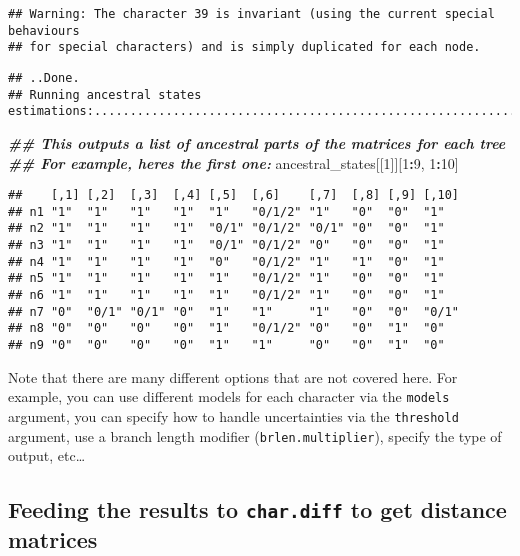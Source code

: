\documentclass[
]{book}
\newenvironment{Shaded}{\begin{snugshade}}{\end{snugshade}}
\newcommand{\DecValTok}[1]{\textcolor[rgb]{0.00,0.00,0.81}{#1}}
\newcommand{\DocumentationTok}[1]{\textcolor[rgb]{0.56,0.35,0.01}{\textbf{\textit{#1}}}}
\newcommand{\NormalTok}[1]{#1}
\newcommand{\SpecialCharTok}[1]{\textcolor[rgb]{0.81,0.36,0.00}{\textbf{#1}}}
\begin{document}
\begin{verbatim}
## Warning: The character 39 is invariant (using the current special behaviours
## for special characters) and is simply duplicated for each node.
\end{verbatim}

\begin{verbatim}
## ..Done.
## Running ancestral states estimations:.....................................................................................................................................................................................................................................................Done.
\end{verbatim}

\begin{Shaded}
\begin{Highlighting}[]
\DocumentationTok{\#\# This outputs a list of ancestral parts of the matrices for each tree}
\DocumentationTok{\#\# For example, here\textquotesingle{}s the first one:}
\NormalTok{ancestral\_states[[}\DecValTok{1}\NormalTok{]][}\DecValTok{1}\SpecialCharTok{:}\DecValTok{9}\NormalTok{, }\DecValTok{1}\SpecialCharTok{:}\DecValTok{10}\NormalTok{]}
\end{Highlighting}
\end{Shaded}

\begin{verbatim}
##    [,1] [,2]  [,3]  [,4] [,5]  [,6]    [,7]  [,8] [,9] [,10]
## n1 "1"  "1"   "1"   "1"  "1"   "0/1/2" "1"   "0"  "0"  "1"  
## n2 "1"  "1"   "1"   "1"  "0/1" "0/1/2" "0/1" "0"  "0"  "1"  
## n3 "1"  "1"   "1"   "1"  "0/1" "0/1/2" "0"   "0"  "0"  "1"  
## n4 "1"  "1"   "1"   "1"  "0"   "0/1/2" "1"   "1"  "0"  "1"  
## n5 "1"  "1"   "1"   "1"  "1"   "0/1/2" "1"   "0"  "0"  "1"  
## n6 "1"  "1"   "1"   "1"  "1"   "0/1/2" "1"   "0"  "0"  "1"  
## n7 "0"  "0/1" "0/1" "0"  "1"   "1"     "1"   "0"  "0"  "0/1"
## n8 "0"  "0"   "0"   "0"  "1"   "0/1/2" "0"   "0"  "1"  "0"  
## n9 "0"  "0"   "0"   "0"  "1"   "1"     "0"   "0"  "1"  "0"
\end{verbatim}

Note that there are many different options that are not covered here.
For example, you can use different models for each character via the \texttt{models} argument, you can specify how to handle uncertainties via the \texttt{threshold} argument, use a branch length modifier (\texttt{brlen.multiplier}), specify the type of output, etc\ldots{}

\hypertarget{feeding-the-results-to-char.diff-to-get-distance-matrices}{%
\subsection{\texorpdfstring{Feeding the results to \texttt{char.diff} to get distance matrices}{Feeding the results to char.diff to get distance matrices}}\label{feeding-the-results-to-char.diff-to-get-distance-matrices}}
\end{document}
